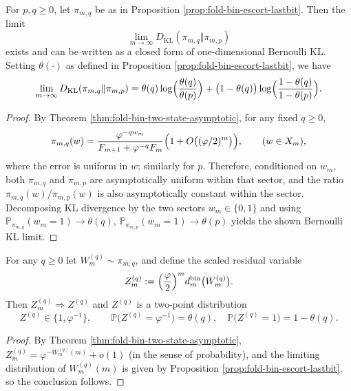 \begin{proposition}\label{prop:fold-bin-escort-escort-kl}
For \(p,q\ge 0\), let \(\pi_{m,q}\) be as in Proposition \ref{prop:fold-bin-escort-lastbit}.
Then the limit
\[
\lim_{m\to\infty}D_{\mathrm{KL}}(\pi_{m,q}\Vert \pi_{m,p})
\]
exists and can be written as a closed form of one-dimensional Bernoulli KL. Setting \(\theta(\cdot)\) as defined in Proposition \ref{prop:fold-bin-escort-lastbit}, we have
\[
\lim_{m\to\infty}D_{\mathrm{KL}}(\pi_{m,q}\Vert \pi_{m,p})
=\theta(q)\log\Bigl(\frac{\theta(q)}{\theta(p)}\Bigr)+\bigl(1-\theta(q)\bigr)\log\Bigl(\frac{1-\theta(q)}{1-\theta(p)}\Bigr).
\]
\end{proposition}

\begin{proof}
By Theorem \ref{thm:fold-bin-two-state-asymptotic}, for any fixed \(q\ge 0\),
\[
\pi_{m,q}(w)=\frac{\varphi^{-qw_m}}{F_{m+1}+\varphi^{-q}F_m}\Bigl(1+O\bigl((\varphi/2)^m\bigr)\Bigr),
\qquad (w\in X_m),
\]
where the error is uniform in \(w\); similarly for \(p\).
Therefore, conditioned on \(w_m\), both \(\pi_{m,q}\) and \(\pi_{m,p}\) are asymptotically uniform within that sector, and the ratio \(\pi_{m,q}(w)/\pi_{m,p}(w)\) is also asymptotically constant within the sector.
Decomposing KL divergence by the two sectors \(w_m\in\{0,1\}\) and using
\(\mathbb{P}_{\pi_{m,q}}(w_m=1)\to \theta(q)\), \(\mathbb{P}_{\pi_{m,p}}(w_m=1)\to \theta(p)\)
yields the shown Bernoulli KL limit.
\end{proof}

\begin{corollary}\label{cor:fold-bin-escort-two-scale-residual}
For any \(q\ge 0\) let \(W^{(q)}_m\sim\pi_{m,q}\), and define the scaled residual variable
\[
Z^{(q)}_m:=\Bigl(\frac{\varphi}{2}\Bigr)^m d^{\mathrm{bin}}_m\bigl(W^{(q)}_m\bigr).
\]
Then \(Z^{(q)}_m\Rightarrow Z^{(q)}\) and \(Z^{(q)}\) is a two-point distribution
\[
Z^{(q)}\in\{1,\varphi^{-1}\},
\qquad
\mathbb{P}\bigl(Z^{(q)}=\varphi^{-1}\bigr)=\theta(q),
\quad
\mathbb{P}\bigl(Z^{(q)}=1\bigr)=1-\theta(q).
\]
\end{corollary}

\begin{proof}
By Theorem \ref{thm:fold-bin-two-state-asymptotic},
\(
Z^{(q)}_m=\varphi^{-W^{(q)}_m(m)}+o(1)
\)
(in the sense of probability), and the limiting distribution of \(W^{(q)}_m(m)\) is given by Proposition \ref{prop:fold-bin-escort-lastbit}, so the conclusion follows.
\end{proof}

